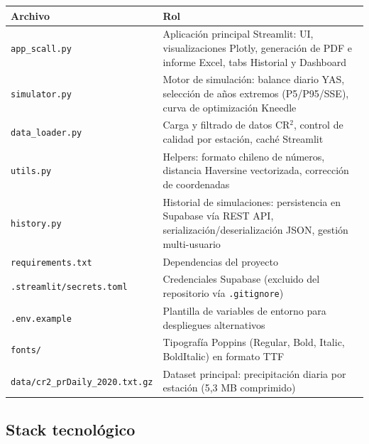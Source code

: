 \documentclass[12pt, a4paper]{article}
\begin{document}
\begin{center}
\begin{tabular}{lp{10cm}}
\toprule
\textbf{Archivo} & \textbf{Rol} \\
\midrule
\texttt{app\_scall.py} & Aplicación principal Streamlit: UI, visualizaciones Plotly, generación de PDF e informe Excel, tabs Historial y Dashboard \\
\texttt{simulator.py} & Motor de simulación: balance diario YAS, selección de años extremos (P5/P95/SSE), curva de optimización Kneedle \\
\texttt{data\_loader.py} & Carga y filtrado de datos CR$^2$, control de calidad por estación, caché Streamlit \\
\texttt{utils.py} & Helpers: formato chileno de números, distancia Haversine vectorizada, corrección de coordenadas \\
\texttt{history.py} & Historial de simulaciones: persistencia en Supabase vía REST API, serialización/deserialización JSON, gestión multi-usuario \\
\texttt{requirements.txt} & Dependencias del proyecto \\
\texttt{.streamlit/secrets.toml} & Credenciales Supabase (excluido del repositorio vía \texttt{.gitignore}) \\
\texttt{.env.example} & Plantilla de variables de entorno para despliegues alternativos \\
\texttt{fonts/} & Tipografía Poppins (Regular, Bold, Italic, BoldItalic) en formato TTF \\
\texttt{data/cr2\_prDaily\_2020.txt.gz} & Dataset principal: precipitación diaria por estación (5,3 MB comprimido) \\
\bottomrule
\end{tabular}
\end{center}

\subsection{Stack tecnológico}
\end{document}
